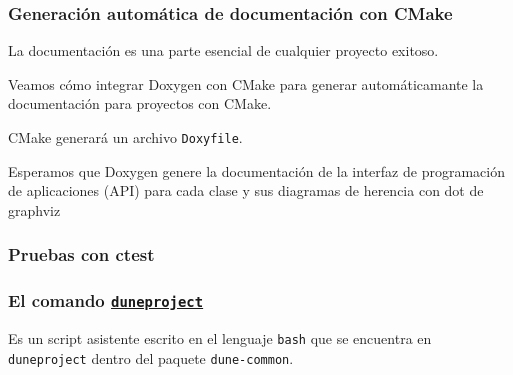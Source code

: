 \begin{frame}
	\frametitle{Generación automática de documentación con CMake}
	La documentación es una parte esencial de cualquier proyecto
	exitoso.

	Veamos cómo integrar Doxygen con CMake para generar
	automáticamante la documentación para proyectos con CMake.

	CMake generará un archivo \lstinline{Doxyfile}.

	Esperamos que Doxygen genere la documentación de la interfaz de
	programación de aplicaciones (API) para cada clase y sus diagramas de herencia con dot de graphviz
\end{frame}

\begin{frame}
	\frametitle{Pruebas con ctest}
\end{frame}



\begin{frame}
	\frametitle{
		El comando \href{https://gitlab.dune-project.org/core/dune-common/-/raw/master/bin/duneproject}{\lstinline{duneproject}}
	}

	Es un script asistente escrito en el lenguaje \lstinline{bash}
	que se encuentra en \lstinline{duneproject}
	dentro del paquete \lstinline{dune-common}.
\end{frame}



